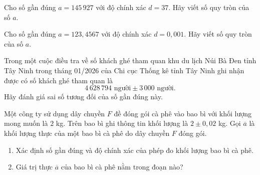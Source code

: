  
\setcounter{ex}{0}
\begin{ex}%
	Cho số gần đúng $a=145\,927$ với độ chính xác $d=37$. Hãy viết số quy tròn của số $a$.
\end{ex}
\begin{ex}%
	Cho số gần đúng $a=123{,}4567$ với độ chính xác $d=0{,}001$. Hãy viết số quy tròn của số $a$.
\end{ex}
\begin{ex}%
	Trong một cuộc điều tra về số khách ghé tham quan khu du lịch Núi Bà Đen tỉnh Tây Ninh trong tháng 01/2026 của Chi cục Thống kê tỉnh Tây Ninh ghi nhận được có số khách ghé tham quan là
	$$4\,628\,794 \text{ người} \pm 3\,000 \text{ người}.$$
	Hãy đánh giá sai số tương đối của số gần đúng này.
\end{ex}
\begin{ex}%
	Một công ty sử dụng dây chuyền $F$ đề đóng gói cà phê vào bao bì với khối lượng mong muốn là $2$ kg. Trên bao bì ghi thông tin khối lượng là $2\pm 0{,}02$ kg. Gọi $\overline{a}$ là khối lượng thực của một bao bì cà phê do dây chuyền $F$ đóng gói.
	\begin{enumerate}
		\item Xác định số gần đúng và độ chính xác của phép đo khối lượng bao bì cà phê.
		\item Giá trị thực $\overline{a}$ của bao bì cà phê nằm trong đoạn nào?
	\end{enumerate}
\end{ex}
